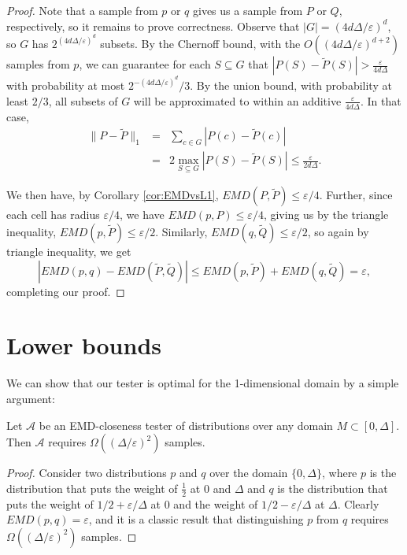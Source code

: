 \documentclass[11pt]{article}
\newcommand{\A}{\mathcal{A}}
\newcommand{\eps}{\varepsilon}
\begin{document}
\begin{proof}
Note that a sample from $p$ or $q$ gives us a sample from $P$ or $Q$, respectively, so it remains to prove correctness.
Observe that $|G| = (4d\Delta/\eps)^d$, so $G$ has $2^{(4d\Delta/\eps)^d}$ subsets. By the Chernoff bound, with the $O((4d\Delta/\eps)^{d+2})$ samples from $p$, we can guarantee for each $S \subseteq G$ that
$|P(S) - \tilde{P}(S)| > \frac{\eps}{4d\Delta}$ with probability at most $2^{-(4d\Delta/\eps)^d}/3$. By the union bound, with probability at least $2/3$, all subsets of $G$ will be approximated to within an additive $\frac{\eps}{4d\Delta}$. In that case,
\begin{eqnarray*}
	\|P - \tilde{P}\|_1
		&=&\sum_{c\in G} |P(c) - \tilde{P}(c)|\\
		&=& 2\max_{S \subseteq G}{|P(S) - \tilde{P}(S)|} \le \frac{\eps}{2d\Delta}.
\end{eqnarray*}

We then have, by Corollary \ref{cor:EMDvsL1},
$EMD(P,\tilde{P}) \le \eps/4$. Further, since each cell has radius $\eps/4$,
we have $EMD(p,P) \le \eps/4$, giving us by the triangle inequality, $EMD(p,\tilde{P}) \le \eps/2$.
Similarly, $EMD(q,\tilde{Q}) \le \eps/2$, so again by triangle inequality, we get
\[
	|EMD(p,q) - EMD(\tilde{P},\tilde{Q})| \le EMD(p,\tilde{P}) + EMD(q,\tilde{Q}) = \eps,
\]
completing our proof.
\end{proof}

\section{Lower bounds}

We can show that our tester is optimal for the 1-dimensional domain by a simple argument:

\begin{theorem}
 	Let $\A$ be an EMD-closeness tester of distributions over any domain $M \subset [0, \Delta]$.
 	Then $\A$ requires $\Omega((\Delta/\eps)^2)$ samples.
\end{theorem}

\begin{proof}
Consider two distributions $p$ and $q$ over the domain $\{0,\Delta\}$, where $p$ is the distribution that puts the weight of $\frac{1}{2}$ at $0$ and $\Delta$ and $q$ is the distribution that puts the weight of $1/2 + \eps/\Delta$ at $0$ and the weight of $1/2 - \eps/\Delta$ at $\Delta$. Clearly $EMD(p,q) = \eps$, and it is a classic result that distinguishing $p$ from $q$ requires $\Omega((\Delta/\eps)^2)$ samples.
\end{proof}
\end{document}
